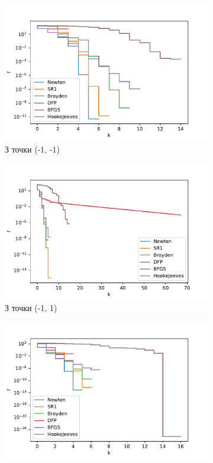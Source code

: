 \begin{figure}[h!]
    \begin{subfigure}{0.5\textwidth}
        \includegraphics[width=\textwidth, trim=0cm 0cm 1.2cm 1cm, clip]{assets/descent_steps/himmelblau_steps_0.pdf}
        \caption{З точки (-1, -1)}
    \end{subfigure}
    \begin{subfigure}{0.5\textwidth}
        \includegraphics[width=\textwidth, trim=0cm 0cm 1.2cm 1cm, clip]{assets/descent_steps/himmelblau_steps_1.pdf}
        \caption{З точки (-1, 1)}
    \end{subfigure}
    \begin{subfigure}{0.5\textwidth}
        \includegraphics[width=\textwidth, trim=0cm 0cm 1.2cm 1cm, clip]{assets/descent_steps/himmelblau_steps_2.pdf}

\end{subfigure}
\end{figure}

